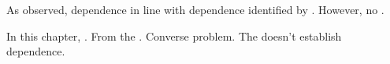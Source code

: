 \chapter{}
\label{cha:zS:sec:requs}

\begin{note}
  As observed, dependence in line with dependence identified by \qWhyV{}.
  However, no \ros{}.

  In this chapter, \requ{}.
  From the \agpe{}.
  Converse problem.
  The \agpe{} doesn't establish dependence.
\end{note}

\section{}
\label{sec:requ3}

